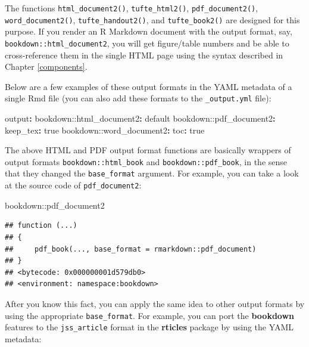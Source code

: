 \documentclass[
  12pt,
]{krantz}
\newenvironment{Shaded}{\begin{snugshade}}{\end{snugshade}}
\newcommand{\AttributeTok}[1]{\textcolor[rgb]{0.77,0.63,0.00}{#1}}
\newcommand{\CharTok}[1]{\textcolor[rgb]{0.31,0.60,0.02}{#1}}
\newcommand{\FunctionTok}[1]{\textcolor[rgb]{0.00,0.00,0.00}{#1}}
\newcommand{\KeywordTok}[1]{\textcolor[rgb]{0.13,0.29,0.53}{\textbf{#1}}}
\newcommand{\NormalTok}[1]{#1}
\newcommand{\SpecialCharTok}[1]{\textcolor[rgb]{0.00,0.00,0.00}{#1}}
\theoremstyle{definition}
\theoremstyle{definition}
\theoremstyle{definition}
\theoremstyle{definition}
\theoremstyle{remark}
\begin{document}
The functions \texttt{html\_document2()}, \texttt{tufte\_html2()}, \texttt{pdf\_document2()}, \texttt{word\_document2()}, \texttt{tufte\_handout2()}, and \texttt{tufte\_book2()} are designed for this purpose. If you render an R Markdown document with the output format, say, \texttt{bookdown::html\_document2}, you will get figure/table numbers and be able to cross-reference them in the single HTML page using the syntax described in Chapter \ref{components}.

Below are a few examples of these output formats in the YAML metadata of a single Rmd file (you can also add these formats to the \texttt{\_output.yml} file):

\begin{Shaded}
\begin{Highlighting}[]
\FunctionTok{output}\KeywordTok{:}
\AttributeTok{  bookdown:}\FunctionTok{:html\_document2}\KeywordTok{:}\AttributeTok{ default}
\AttributeTok{  bookdown:}\FunctionTok{:pdf\_document2}\KeywordTok{:}
\AttributeTok{    }\FunctionTok{keep\_tex}\KeywordTok{:}\AttributeTok{ }\CharTok{true}
\AttributeTok{  bookdown:}\FunctionTok{:word\_document2}\KeywordTok{:}
\AttributeTok{    }\FunctionTok{toc}\KeywordTok{:}\AttributeTok{ }\CharTok{true}
\end{Highlighting}
\end{Shaded}

The above HTML and PDF output format functions are basically wrappers of output formats \texttt{bookdown::html\_book} and \texttt{bookdown::pdf\_book}, in the sense that they changed the \texttt{base\_format} argument. For example, you can take a look at the source code of \texttt{pdf\_document2}:

\begin{Shaded}
\begin{Highlighting}[]
\NormalTok{bookdown}\SpecialCharTok{::}\NormalTok{pdf\_document2}
\end{Highlighting}
\end{Shaded}

\begin{verbatim}
## function (...) 
## {
##     pdf_book(..., base_format = rmarkdown::pdf_document)
## }
## <bytecode: 0x000000001d579db0>
## <environment: namespace:bookdown>
\end{verbatim}

After you know this fact, you can apply the same idea to other output formats by using the appropriate \texttt{base\_format}. For example, you can port the \textbf{bookdown} features to the \texttt{jss\_article} format in the \textbf{rticles} package \citep{R-rticles} by using the YAML metadata:
\end{document}
